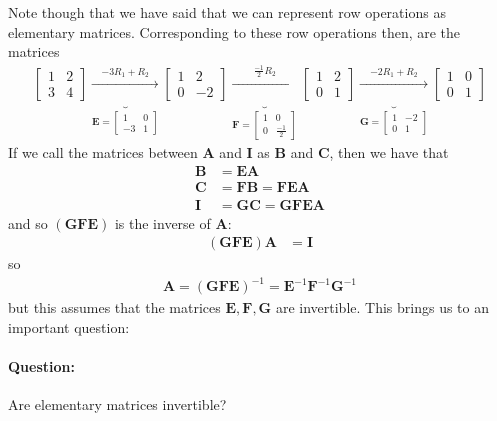 \documentclass[11pt]{article}
\newcommand{\ques}{\paragraph{Question:}}
\newcommand{\mat}[1]{\mathbf{#1}}
\begin{document}
Note though that we have said that we can represent row operations as elementary matrices. Corresponding to these row operations then, are the matrices
\begin{align*}
\begin{bmatrix}1 & 2 \\ 3 & 4\end{bmatrix}
\underbrace{\xrightarrow[]{-3 R_1 + R_2}}_{\mat{E} = \begin{bmatrix}1 & 0 \\ -3 & 1\end{bmatrix}}
\begin{bmatrix}1 & 2 \\ 0 & -2\end{bmatrix}
\underbrace{\xrightarrow[]{\frac{-1}{2} R_2}}_{\mat{F} = \begin{bmatrix}1 & 0 \\ 0 & \frac{-1}{2}\end{bmatrix}}
\begin{bmatrix}1 & 2 \\ 0 & 1\end{bmatrix}
\underbrace{\xrightarrow[]{-2 R_1 + R_2}}_{\mat{G} = \begin{bmatrix}1 & -2 \\ 0 & 1\end{bmatrix}}
\begin{bmatrix}1 & 0 \\ 0 & 1\end{bmatrix}
\end{align*}
If we call the matrices between $\mat{A}$ and $\mat{I}$ as $\mat{B}$ and $\mat{C}$, then we have that
\begin{align*}
\mat{B} &= \mat{E} \mat{A}
\\
\mat{C} &= \mat{F} \mat{B} = \mat{F} \mat{E} \mat{A}
\\
\mat{I} &= \mat{G} \mat{C} = \mat{G} \mat{F} \mat{E} \mat{A}
\end{align*}
and so $\left( \mat{G} \mat{F} \mat{E} \right)$ is the inverse of $\mat{A}$:
\begin{align*}
\left( \mat{G} \mat{F} \mat{E} \right) \mat{A} &= \mat{I}
\end{align*}
so
\begin{align*}
\mat{A} = \left( \mat{G} \mat{F} \mat{E} \right)^{-1}
= \mat{E}^{-1} \mat{F}^{-1} \mat{G}^{-1}
\end{align*}
but this assumes that the matrices $\mat{E}, \mat{F}, \mat{G}$ are invertible. This brings us to an important question:
\ques Are elementary matrices invertible?
\end{document}
